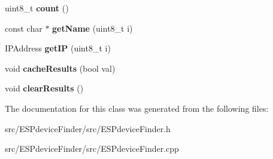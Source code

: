 \begin{DoxyCompactItemize}
uint8\+\_\+t {\bfseries count} ()
\item 
\mbox{\label{class_e_s_pdevice_finder_a75fb47fe700aab08dc30740e093421e8}} 
const char $\ast$ {\bfseries get\+Name} (uint8\+\_\+t i)
\item 
\mbox{\label{class_e_s_pdevice_finder_a169118a96c267f8ce73cecffdab2759b}} 
I\+P\+Address {\bfseries get\+IP} (uint8\+\_\+t i)
\item 
\mbox{\label{class_e_s_pdevice_finder_a391e961c110cba87d250a0f151ee51a2}} 
void {\bfseries cache\+Results} (bool val)
\item 
\mbox{\label{class_e_s_pdevice_finder_adbc71125eedd3791e9443b14cd1a320f}} 
void {\bfseries clear\+Results} ()
\end{DoxyCompactItemize}


The documentation for this class was generated from the following files\+:\begin{DoxyCompactItemize}
\item 
src/\+E\+S\+Pdevice\+Finder/src/E\+S\+Pdevice\+Finder.\+h\item 
src/\+E\+S\+Pdevice\+Finder/src/E\+S\+Pdevice\+Finder.\+cpp\end{DoxyCompactItemize}
